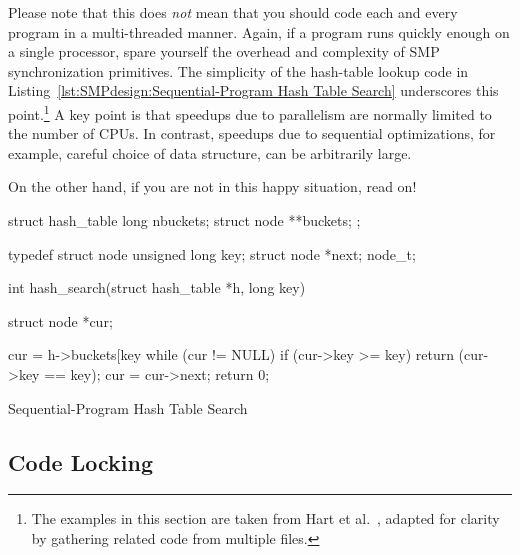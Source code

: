 Please note that this does \emph{not} mean that you should code each
and every program in a multi-threaded manner.
Again, if a program runs quickly enough on a single processor,
spare yourself the overhead and complexity of SMP synchronization
primitives.
The simplicity of the hash-table lookup code in
Listing~\ref{lst:SMPdesign:Sequential-Program Hash Table Search}
underscores this point.\footnote{
	The examples in this section are taken from Hart et
	al.~\cite{ThomasEHart2006a}, adapted for clarity
	by gathering related code from multiple files.}
A key point is that speedups due to parallelism are normally
limited to the number of CPUs.
In contrast, speedups due to sequential optimizations, for example,
careful choice of data structure, can be arbitrarily large.

On the other hand, if you are not in this happy situation, read on!

\begin{listing}[tbhp]
\begin{VerbatimL}[commandchars=\\\[\]]
struct hash_table
{
	long nbuckets;
	struct node **buckets;
};

typedef struct node {
	unsigned long key;
	struct node *next;
} node_t;

int hash_search(struct hash_table *h, long key)
{
	struct node *cur;

	cur = h->buckets[key %
	while (cur != NULL) {
		if (cur->key >= key) {
			return (cur->key == key);
		}
		cur = cur->next;
	}
	return 0;
}
\end{VerbatimL}
\caption{Sequential-Program Hash Table Search}
\label{lst:SMPdesign:Sequential-Program Hash Table Search}
\end{listing}


\subsection{Code Locking}
\label{sec:SMPdesign:Code Locking}


